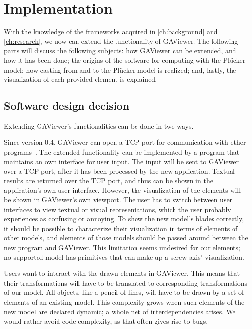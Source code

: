 \section{Implementation}
\label{ch:implementation}
With the knowledge of the frameworks acquired in \autoref{ch:background} and \autoref{ch:research}, we now can extend the functionality of GAViewer.  The following parts will discuss the following subjects: how GAViewer can be extended, and how it has been done;  the origins of the software for computing with the Pl\"ucker model;  how casting from and to the Pl\"ucker model is realized;  and, lastly, the visualization of each provided element is explained.


\subsection{Software design decision}
\label{sec:softwaredesign}
Extending GAViewer's functionalities can be done in two ways.  

Since version 0.4, GAViewer can open a TCP port for communication with other programs~\cite{GAViewer}.  The extended functionality can be implemented by a program that maintains an own interface for user input.  The input will be sent to GAViewer over a TCP port, after it has been processed by the new application.  Textual results are returned over the TCP port, and thus can be shown in the application's own user interface.  However, the visualization of the elements will be shown in GAViewer's own viewport.  The user has to switch between user interfaces to view textual or visual representations, which the user probably experiences as confusing or annoying.  To show the new model's blades correctly, it should be possible to characterize their visualization in terms of elements of other models, and elements of those models should be passed around between the new program and GAViewer.  This limitation seems undesired for our elements; no supported model has primitives that can make up a screw axis' visualization.  

Users want to interact with the drawn elements in GAViewer.  This means that their transformations will have to be translated to corresponding transformations of our model.  All objects, like a pencil of lines, will have to be drawn by a set of elements of an existing model.  This complexity grows when such elements of the new model are declared dynamic; a whole net of interdependencies arises.  We would rather avoid code complexity, as that often gives rise to bugs.

